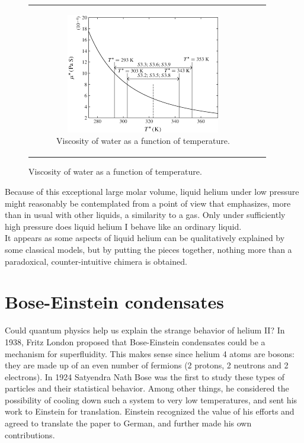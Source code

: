 \documentclass{article}
\begin{document}
\begin{figure}[H]
\begin{tabular}{cc}
\begin{subfigure}{0.5\textwidth}
            \includegraphics[width=\linewidth]{Images/waterVis.png}
            \caption{Viscosity of water as a function of temperature.}
            \label{fig:enter-label}
        \end{subfigure}
   
    \end{tabular}
\end{figure}

Because of this exceptional large molar volume, liquid helium under low pressure might reasonably be contemplated from a point of view that emphasizes, more than in usual with other liquids, a similarity to a gas. Only under sufficiently high pressure does liquid helium I behave like an ordinary liquid.
\\

It appears as some aspects of liquid helium can be qualitatively explained by some classical models, but by putting the pieces together, nothing more than a paradoxical, counter-intuitive chimera is obtained. 

\section{Bose-Einstein condensates}

Could quantum physics help us explain the strange behavior of helium II\@?  In 1938, Fritz London proposed that Bose-Einstein condensates could be a mechanism for superfluidity.  This makes sense since helium 4 atoms are bosons: they are made up of an even number of fermions (2 protons, 2 neutrons and 2 electrons).  In 1924 Satyendra Nath Bose was the first to study these types of particles and their statistical behavior.  Among other things, he considered the possibility of cooling down such a system to very low temperatures, and sent his work to Einstein for translation.  Einstein recognized the value of his efforts and agreed to translate the paper to German, and further made his own contributions.
\end{document}

